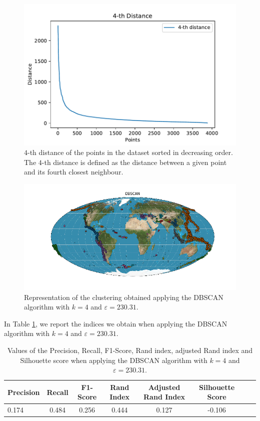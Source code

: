 \documentclass[a4paper]{article}
\begin{document}
	\begin{figure}[H]
		\includegraphics[width=\linewidth]{k_dist_dbscan.pdf}
		\caption{$4$-th distance of the points in the dataset sorted in decreasing order. The $4$-th distance is defined as the distance between a given point and its fourth closest neighbour.}
		\label{fig:dbscan_distance}
	\end{figure}

	 \begin{figure}[H]
		\includegraphics[width=\linewidth]{DBSCAN.png}
		\caption{Representation of the clustering obtained applying the DBSCAN algorithm with $k= 4$ and $\varepsilon = 230.31$.}
		\label{fig:dbscan_world}
	\end{figure}

	In Table \ref{table:DBSCAN}, we report the indices we obtain when applying the DBSCAN algorithm with $k=4$ and $\varepsilon= 230.31$.\\

	\begin{table}[H]
		\centering
		\begin{tabular}{l*{6}{c}r}
			Precision & Recall & F1-Score & Rand Index & Adjusted Rand Index  & Silhouette Score \\
			\hline
			0.174 & 0.484 & 0.256 & 0.444 & 0.127 & -0.106 \\
		\end{tabular}
	\caption{Values of the Precision, Recall, F1-Score, Rand index, adjusted Rand index and Silhouette score when applying the DBSCAN algorithm with $k = 4$ and $\varepsilon = 230.31$.}
	\label{table:DBSCAN}
	\end{table}
\end{document}
